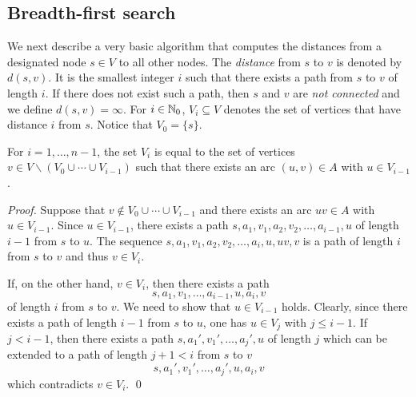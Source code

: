 \subsection{Breadth-first search}
\label{subsec:BFs}

We next describe a very basic algorithm that  computes the distances 
from a designated node  $s \in V$ to all other nodes. 
The \emph{distance} from $s$ to $v$ is denoted by $d(s,v)$. It is the
smallest integer $i$ such that there exists a path from $s$ to $v$ of
length $i$.  If there does not exist such a path, then  $s$ and $v$
are \emph{not connected} and we define $d(s,v) = \infty$. For $ i \in
\mathbb{N}_0$,  $V_i\subseteq V$ denotes  the set of vertices that have distance $i$
from $s$.  Notice that $V_0 = \{s\}$. 

\begin{lemma}
  \label{lem:15}
  For $i=1,\ldots,n-1$, the set   $V_{i}$ is equal to the set of 
  vertices $v \in V \backslash (V_0\cup\cdots\cup V_{i-1})$ such that there exists an arc 
  $(u,v) \in A$ with $u \in V_{i-1}$.
\end{lemma}


\begin{proof}
  Suppose that $v \notin V_0\cup\cdots\cup V_{i-1}$ and there exists an arc $uv\in A$
  with $u \in V_{i-1}$. Since $u \in V_{i-1}$, there exists a path
  $s,a_1,v_1,a_2,v_2,\ldots,a_{i-1},u$ of length $i-1$ from $s$ to $u$. The
  sequence  $s,a_1,v_1,a_2,v_2,\ldots,a_i,u,uv,v$ is a path of length
  $i$ from $s$ to $v$ and thus $v \in V_{i}$. 

  If, on the other hand, $v \in V_{i}$, then there exists a path 
  \begin{displaymath}
    s,a_1,v_1,\ldots,a_{i-1},u,a_{i},v
  \end{displaymath}
  of length $i$ from $s$ to $v$. We need to show that $u \in V_{i-1}$
  holds. Clearly, since there exists a path of length $i-1$ from $s$ to
  $u$, one has $u \in V_j$ with $j\leq i-1$. If $j<i-1$, then there exists
  a path $s,a_1',v_1',\ldots,a_j',u$ of length $j$ which can be extended
  to a path of length $j+1<i$ from $s$ to $v$
  \begin{displaymath}
    s,a_1',v_1',\ldots,a_j',u,a_{i},v
  \end{displaymath}
  which contradicts $v\in V_i$.  \qed

\end{proof}



